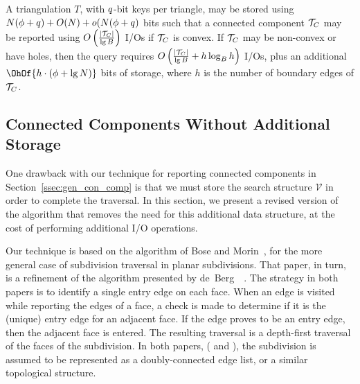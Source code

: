{  \begin{theorem}\label{thm:conn_comp}
  A triangulation $T$, with $q$-bit keys per triangle, may be 
  stored using 
  $N(\phi + q) + O(N) + o(N(\phi + q)$ 
  bits such that a 
  connected component ${\mathcal{T}}_C$ may be reported using 
  $O \left( \frac{|{\mathcal{T}}_C|}{\lg{B}} \right)$ I/Os if ${\mathcal{T}}_C$
  is convex.  
  If ${\mathcal{T}}_C$ may be non-convex or have holes, then the query requires 
  $O\left( \frac{|{\mathcal{T}}_C|}{\lg{B}}  + h \log_B{h}\right)$ 
  I/Os, plus an additional $\OhOf{h \cdot(\bitsPerPoint + \lg{N})}$ bits of storage, 
  where $h$ is the number of boundary edges of 
  ${\mathcal{T}}_C$.
  \end{theorem}

  \subsection{Connected Components Without Additional Storage}
  \label{ssec:no_add_storage}

  One drawback with our technique for reporting connected components 
  in Section~\ref{ssec:gen_con_comp} is that 
  we must store the search structure $\mathcal{V}$ in order to complete the 
  traversal. 
  In this section, we present a revised version of the algorithm that removes 
  the need for this additional data structure, at the cost of performing 
  additional I/O operations.

  Our technique is based on the algorithm of Bose and 
  Morin~\cite{DBLP:conf/isaac/BoseM00}, for the more general case of subdivision 
  traversal in planar subdivisions. 
  That paper, in turn, is a refinement of the algorithm presented by 
  de~Berg~\etal~\cite{deberg_et_al_1997}. 
  The strategy in both papers is to identify a single entry edge on each face. 
  When an edge is visited while reporting the edges of a face, a check is made 
  to determine if it is the (unique) entry edge for an adjacent face. 
  If the edge proves to be an entry edge, then the adjacent face is entered. 
  The resulting traversal is a depth-first traversal of the faces of the 
  subdivision. 
  In both papers, (\cite{DBLP:conf/isaac/BoseM00} and \cite{deberg_et_al_1997}),
  the subdivision is assumed 
  to be represented as a doubly-connected edge list, or a similar 
  topological structure. 

}
